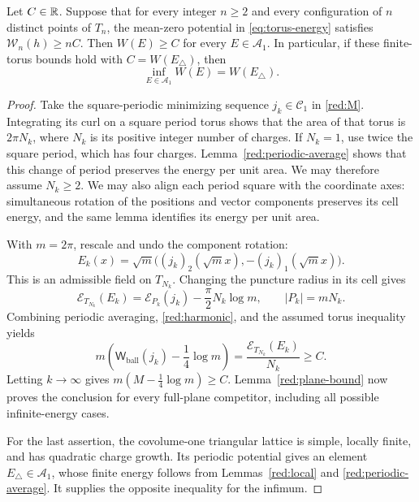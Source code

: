 \begin{proposition}\label{red:reduction}
Let $C\in\mathbb R$.  Suppose that for every integer $n\ge2$ and every
configuration of $n$ distinct points of $T_n$, the mean-zero
potential in \eqref{eq:torus-energy} satisfies
$\mathcal W_n(h)\ge nC$.  Then $W(E)\ge C$ for every
$E\in\mathcal A_1$.  In particular, if these finite-torus bounds
hold with $C=W(E_\triangle)$, then
\[
 \inf_{E\in\mathcal A_1}W(E)=W(E_\triangle).
\]
\end{proposition}

\begin{proof}
Take the square-periodic minimizing sequence $j_k\in\mathcal C_1$
in \eqref{red:M}.  Integrating its curl on a square period torus
shows that the area of that torus is $2\pi N_k$, where $N_k$ is
its positive integer number of charges.  If $N_k=1$, use twice
the square period, which has four charges.  Lemma~\ref{red:periodic-average}
shows that this change of period preserves the energy per unit
area.  We may therefore assume $N_k\ge2$.  We may also align each
period square with the coordinate axes: simultaneous rotation of
the positions and vector components preserves its cell energy,
and the same lemma identifies its energy per unit area.

With $m=2\pi$, rescale and undo the component rotation:
\[
 E_k(x)=\sqrt m\bigl((j_k)_2(\sqrt m x),
                         -(j_k)_1(\sqrt m x)\bigr).
\]
This is an admissible field on $T_{N_k}$.  Changing the puncture
radius in its cell gives
\[
 \mathcal E_{T_{N_k}}(E_k)
 =\mathcal E_{P_k}(j_k)-\frac\pi2N_k\log m,
 \qquad |P_k|=mN_k.
\]
Combining periodic averaging, \eqref{red:harmonic}, and the
assumed torus inequality yields
\[
 m\left(\mathsf W_{\mathrm{ball}}(j_k)-\frac14\log m\right)
 =\frac{\mathcal E_{T_{N_k}}(E_k)}{N_k}\ge C.
\]
Letting $k\to\infty$ gives $m(M-\frac14\log m)\ge C$.
Lemma~\ref{red:plane-bound} now proves the conclusion for every
full-plane competitor, including all possible infinite-energy cases.

For the last assertion, the covolume-one triangular lattice is
simple, locally finite, and has quadratic charge growth.  Its
periodic potential gives an element $E_\triangle\in\mathcal A_1$,
whose finite energy follows from Lemmas~\ref{red:local} and
\ref{red:periodic-average}.  It supplies the opposite inequality
for the infimum.
\end{proof}
